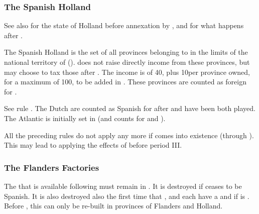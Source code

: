 \subsubsection{The Spanish Holland}\label{chSpecific:Spain:Spanish Holland}
\aparag See also  for the state of Holland before
annexation by \SPA, and  for what
happens after .

 \label{chSpecific:Spain:Dutch Tax} The Spanish
Holland is the set of all provinces belonging to \SPA in the limits of
the national territory of 
(). \SPA does not raise directly income
from these provinces, but may choose to tax those after
.
\bparag The income is of 40\ducats, plus 10\ducats per province owned,
for a maximum of 100\ducats, to be added in .
\bparag These provinces are counted as foreign for
.

 See rule .
\bparag The Dutch \TradeFLEET are counted as Spanish for
 after  and
 have been both played. The Atlantic
 is initially set in  (and
counts for  and ).
%

\aparag All the preceding rules do not apply any more if
 comes into existence (through
). This may lead to applying
the effects of  before period III.


\subsubsection{The Flanders Factories}\label{chSpecific:Spain:Cloth}
\aparag The  \MNU that is available following
 must remain in
. It is destroyed if  ceases
to be Spanish.
\bparag It is also destroyed also the first time that \ENG, \HOL and
\FRA each have a  \MNU and if \SPA is
.
\bparag Before , this  \MNU can only
be re-built in provinces of Flanders and Holland.


